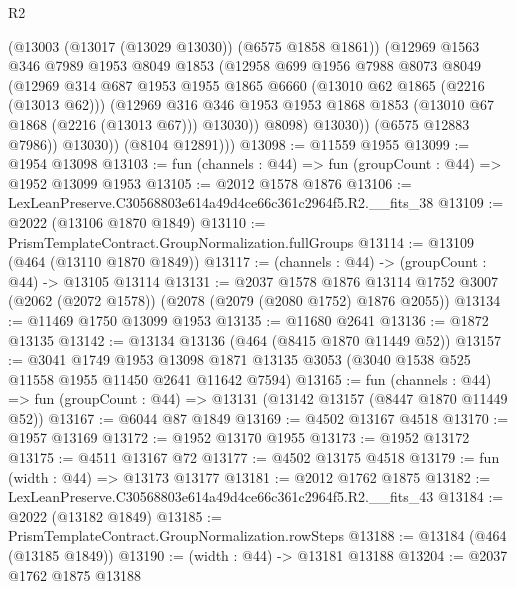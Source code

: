 \begin{lexlean}{R2}
\begin{coremodule}
                (@13003 (@13017 (@13029 @13030)) (@6575 @1858 @1861))
                (@12969
                  @1563
                  @346
                  @7989
                  @1953
                  @8049
                  @1853
                  (@12958
                    @699
                    @1956
                    @7988
                    @8073
                    @8049
                    (@12969
                      @314
                      @687
                      @1953
                      @1955
                      @1865
                      @6660
                      (@13010 @62 @1865 (@2216 (@13013 @62)))
                      (@12969
                        @316
                        @346
                        @1953
                        @1953
                        @1868
                        @1853
                        (@13010 @67 @1868 (@2216 (@13013 @67)))
                        @13030))
                    @8098)
                  @13030))
              (@6575 @12883 @7986))
            @13030))
        (@8104 @12891)))
@13098 := @11559 @1955
@13099 := @1954 @13098
@13103 := fun (channels : @44) => fun (groupCount : @44) => @1952 @13099 @1953
@13105 := @2012 @1578 @1876
@13106 := LexLeanPreserve.C30568803e614a49d4ce66c361c2964f5.R2.__fits_38
@13109 := @2022 (@13106 @1870 @1849)
@13110 := PrismTemplateContract.GroupNormalization.fullGroups
@13114 := @13109 (@464 (@13110 @1870 @1849))
@13117 := (channels : @44) -> (groupCount : @44) -> @13105 @13114
@13131 := @2037
    @1578
    @1876
    @13114
    @1752
    @3007
    (@2062 (@2072 @1578))
    (@2078 (@2079 (@2080 @1752) @1876 @2055))
@13134 := @11469 @1750 @13099 @1953
@13135 := @11680 @2641
@13136 := @1872 @13135
@13142 := @13134 @13136 (@464 (@8415 @1870 @11449 @52))
@13157 := @3041
    @1749
    @1953
    @13098
    @1871
    @13135
    @3053
    (@3040 @1538 @525 @11558 @1955 @11450 @2641 @11642 @7594)
@13165 := fun (channels : @44) =>
  fun (groupCount : @44) => @13131 (@13142 @13157 (@8447 @1870 @11449 @52))
@13167 := @6044 @87 @1849
@13169 := @4502 @13167 @4518
@13170 := @1957 @13169
@13172 := @1952 @13170 @1955
@13173 := @1952 @13172
@13175 := @4511 @13167 @72
@13177 := @4502 @13175 @4518
@13179 := fun (width : @44) => @13173 @13177
@13181 := @2012 @1762 @1875
@13182 := LexLeanPreserve.C30568803e614a49d4ce66c361c2964f5.R2.__fits_43
@13184 := @2022 (@13182 @1849)
@13185 := PrismTemplateContract.GroupNormalization.rowSteps
@13188 := @13184 (@464 (@13185 @1849))
@13190 := (width : @44) -> @13181 @13188
@13204 := @2037
    @1762
    @1875
    @13188

\end{coremodule}
\end{lexlean}
